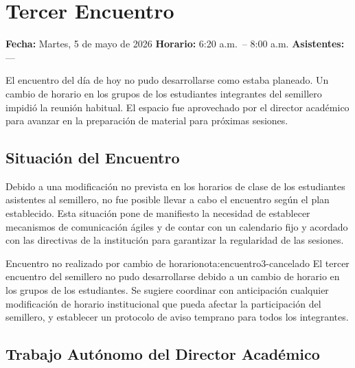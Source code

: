 \chapter{Tercer Encuentro}

\begin{destacado}
    \textbf{Fecha:} Martes, 5 de mayo de 2026 \quad
    \textbf{Horario:} 6:20 a.m.\ -- 8:00 a.m. \quad
    \textbf{Asistentes:} ---
\end{destacado}

\medskip

El encuentro del día de hoy no pudo desarrollarse como estaba planeado. Un cambio de
horario en los grupos de los estudiantes integrantes del semillero impidió la reunión
habitual. El espacio fue aprovechado por el director académico para avanzar en la
preparación de material para próximas sesiones.

\section{Situación del Encuentro}

Debido a una modificación no prevista en los horarios de clase de los estudiantes
asistentes al semillero, no fue posible llevar a cabo el encuentro según el plan
establecido. Esta situación pone de manifiesto la necesidad de establecer mecanismos
de comunicación ágiles y de contar con un calendario fijo y acordado con las
directivas de la institución para garantizar la regularidad de las sesiones.

\begin{nota}{Encuentro no realizado por cambio de horario}{nota:encuentro3-cancelado}
    El tercer encuentro del semillero no pudo desarrollarse debido a un cambio de
    horario en los grupos de los estudiantes. Se sugiere coordinar con anticipación
    cualquier modificación de horario institucional que pueda afectar la participación
    del semillero, y establecer un protocolo de aviso temprano para todos los
    integrantes.
\end{nota}

\section{Trabajo Autónomo del Director Académico}

